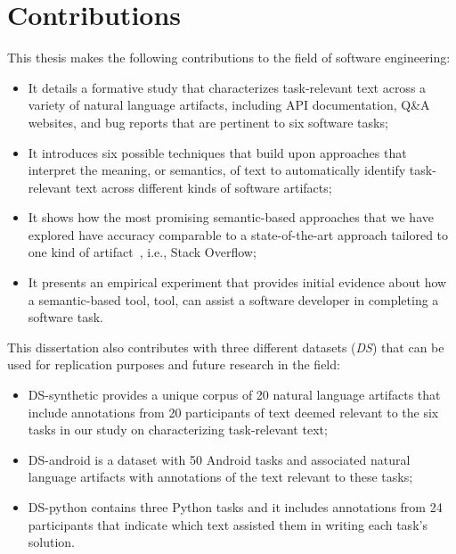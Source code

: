 

\section{Contributions}
\label{cp1:contributions}

This thesis makes the following contributions to the field of software engineering: 




\begin{itemize}

    \item It details a formative study that characterizes task-relevant text across a variety of natural language artifacts, including  API documentation, Q\&A websites, and
    bug reports that are pertinent to six software tasks; 

    \item It introduces six possible techniques that build upon approaches that interpret the meaning, or semantics, of text
    to automatically identify task-relevant text across different kinds of software artifacts;


    \item It shows how the most promising semantic-based approaches that we have explored have accuracy comparable to a state-of-the-art approach
    tailored to one kind of artifact~\cite{Xu2017}, i.e., Stack Overflow;

    \item It presents an empirical experiment that provides initial evidence about how  
    a semantic-based tool, \acs{tool}, can assist a software developer in completing a software task. 
\end{itemize}





This dissertation also contributes with three different datasets ({\small \textit{DS}}) that can be used for replication purposes and future research in the field:
    
\begin{itemize}
    \item \acs{DS-synthetic} provides a unique corpus of 20 natural language artifacts that include annotations from 20 participants of text deemed relevant to 
    the six tasks in our study on characterizing task-relevant text;
    
    \item \acs{DS-android} is a dataset with 50 Android tasks     
    and associated natural language artifacts 
    with annotations of the text relevant to these tasks;

    \item \acs{DS-python} contains three Python tasks and it includes annotations from 24 participants that indicate which
    text assisted them in writing each task's solution.
\end{itemize}